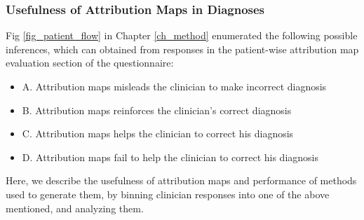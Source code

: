\documentclass[../report.tex]{subfiles}
\begin{document}
  \subsubsection{Usefulness of Attribution Maps in Diagnoses}
  Fig \ref{fig_patient_flow} in Chapter \ref{ch_method} enumerated the following possible inferences, which can obtained from responses in the patient-wise attribution map evaluation section of the questionnaire:
  \begin{itemize}
  	\item A. Attribution maps misleads the clinician to make incorrect diagnosis
  	\item B. Attribution maps reinforces the clinician's correct diagnosis
  	\item C. Attribution maps helps the clinician to correct his diagnosis
  	\item D. Attribution maps fail to help the clinician to correct his diagnosis
  \end{itemize} 
  Here, we describe the usefulness of attribution maps and performance of methods used to generate them, by binning clinician responses into one of the above mentioned, and analyzing them. 
  
\end{document}
